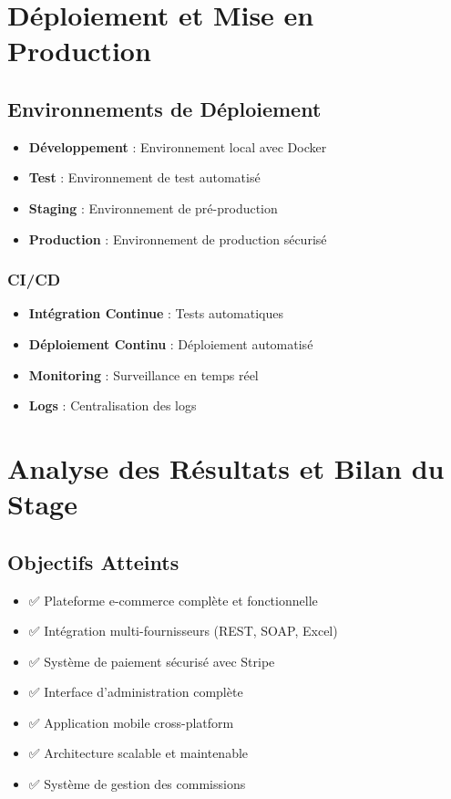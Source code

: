 \documentclass[12pt,a4paper]{report}
\begin{document}
\chapter{Déploiement et Mise en Production}

\section{Environnements de Déploiement}

\begin{itemize}
    \item \textbf{Développement} : Environnement local avec Docker
    \item \textbf{Test} : Environnement de test automatisé
    \item \textbf{Staging} : Environnement de pré-production
    \item \textbf{Production} : Environnement de production sécurisé
\end{itemize}

\subsection{CI/CD}

\begin{itemize}
    \item \textbf{Intégration Continue} : Tests automatiques
    \item \textbf{Déploiement Continu} : Déploiement automatisé
    \item \textbf{Monitoring} : Surveillance en temps réel
    \item \textbf{Logs} : Centralisation des logs
\end{itemize}

\chapter{Analyse des Résultats et Bilan du Stage}

\section{Objectifs Atteints}

\begin{itemize}
    \item ✅ Plateforme e-commerce complète et fonctionnelle
    \item ✅ Intégration multi-fournisseurs (REST, SOAP, Excel)
    \item ✅ Système de paiement sécurisé avec Stripe
    \item ✅ Interface d'administration complète
    \item ✅ Application mobile cross-platform
    \item ✅ Architecture scalable et maintenable
    \item ✅ Système de gestion des commissions
\end{itemize}
\end{document}
